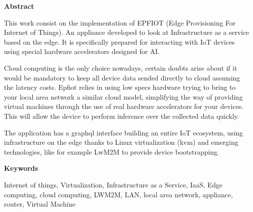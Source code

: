 
\newpage

\thispagestyle{empty}

\begin{center}

{\bf \Huge Abstract}

  \end{center}
\vspace{1cm}

This work consist on the implementation of EPFIOT (Edge Provisioning For Internet of Things). An appliance developed to look at Infrastructure as a service based on the edge. It is specifically prepared for interacting with IoT devices using special hardware accelerators designed for AI.

Cloud computing is the only choice nowadays, certain doubts arise about if it would be mandatory to keep all device data sended directly to cloud assuming the latency costs. Epfiot relies in using low specs hardware trying to bring to your local area network a similar cloud model, simplifying the way of providing virtual machines through the use of real hardware accelerators for your devices. This will allow the device to perform inference over the collected data quickly.

The application has a graphql interface building an entire IoT ecosystem, using infrastructure on the edge thanks to Linux virtualization (kvm) and emerging technologies, like for example LwM2M to provide device bootstrapping.

\vspace{1cm}


\begin{center}

{\bf \Large Keywords}

   \end{center}

   \vspace{0.5cm}
   
Internet of things, Virtualization, Infrastructure as a Service, IaaS, Edge computing, cloud computing, LWM2M, LAN, local area network, appliance, router, Virtual Machine
   


